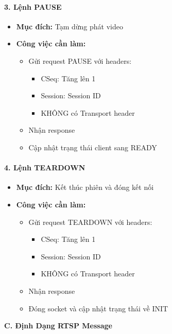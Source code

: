 \documentclass[a4paper,12pt]{article}
\begin{document}
\paragraph{3. Lệnh PAUSE}
\begin{itemize}
    \item \textbf{Mục đích:} Tạm dừng phát video
    \item \textbf{Công việc cần làm:}
    \begin{itemize}
        \item Gửi request PAUSE với headers:
        \begin{itemize}
            \item CSeq: Tăng lên 1
            \item Session: Session ID
            \item KHÔNG có Transport header
        \end{itemize}
        \item Nhận response
        \item Cập nhật trạng thái client sang READY
    \end{itemize}
\end{itemize}

\paragraph{4. Lệnh TEARDOWN}
\begin{itemize}
    \item \textbf{Mục đích:} Kết thúc phiên và đóng kết nối
    \item \textbf{Công việc cần làm:}
    \begin{itemize}
        \item Gửi request TEARDOWN với headers:
        \begin{itemize}
            \item CSeq: Tăng lên 1
            \item Session: Session ID
            \item KHÔNG có Transport header
        \end{itemize}
        \item Nhận response
        \item Đóng socket và cập nhật trạng thái về INIT
    \end{itemize}
\end{itemize}

\textbf{C. Định Dạng RTSP Message}
\end{document}
